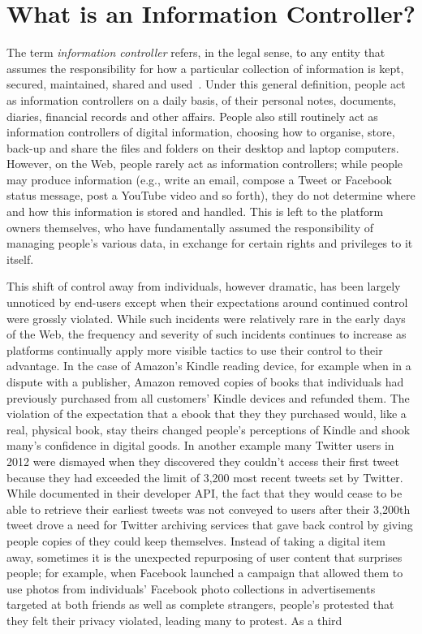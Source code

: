 \documentclass{amsart}
\begin{document}
\section{What is an Information Controller?}

The term \emph{information controller} refers, in the legal sense, to any entity that assumes the responsibility for how a particular collection of information is kept, secured, maintained, shared and used~\cite{}.  Under this general definition, people act as information controllers on a daily basis, of their personal notes, documents, diaries, financial records and other affairs.  People also still routinely act as information controllers of digital information, choosing how to organise, store, back-up and share the files and folders on their desktop and laptop computers. However, on the Web, people rarely act as information controllers; while people may produce information (e.g., write an email, compose a Tweet or Facebook status message, post a YouTube video and so forth), they do not determine where and how this information is stored and handled.  This is left to the platform owners themselves, who have fundamentally assumed the responsibility of managing people's various data, in exchange for certain rights and privileges to it itself.

This shift of control away from individuals, however dramatic, has been largely unnoticed by end-users except when their expectations around continued control were grossly violated.  While such incidents were relatively rare in the early days of the Web, the frequency and severity of such incidents continues to increase as platforms continually apply more visible tactics to use their control to their advantage.   In the case of Amazon's Kindle reading device, for example when in a dispute with a publisher, Amazon removed copies of books that individuals had previously purchased from all customers' Kindle devices and refunded them.  The violation of the expectation that a ebook that they they purchased would, like a real, physical book, stay theirs changed people's perceptions of Kindle and shook many's confidence in digital goods.  In another example many Twitter users in 2012 were dismayed when they discovered they couldn't access their first tweet because they had exceeded the limit of 3,200 most recent tweets set by Twitter.  While documented in their developer API, the fact that they would cease to be able to retrieve their earliest tweets was not conveyed to users after their 3,200th tweet drove a need for Twitter archiving services that gave back control by giving people copies of they could keep themselves.  Instead of taking a digital item away, sometimes it is the unexpected repurposing of user content that surprises people; for example, when Facebook launched a campaign that allowed them to use photos from individuals' Facebook photo collections in advertisements targeted at both friends as well as complete strangers, people's protested that they felt their privacy violated, leading many to protest.  As a third
\end{document}
